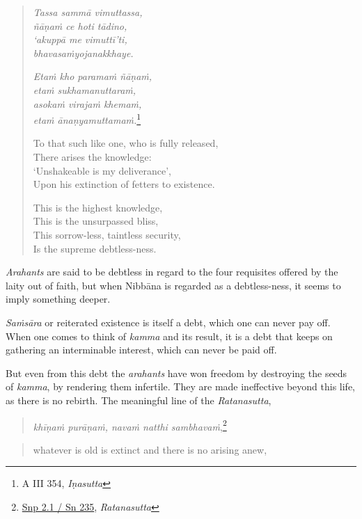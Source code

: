 \begin{quote}
\emph{Tassa sammā vimuttassa,}\\
\emph{ñāṇaṁ ce hoti tādino,}\\
\emph{`akuppā me vimuttī'ti,}\\
\emph{bhavasaṁyojanakkhaye.}

\emph{Etaṁ kho paramaṁ ñāṇaṁ,}\\
\emph{etaṁ sukhamanuttaraṁ,}\\
\emph{asokaṁ virajaṁ khemaṁ,}\\
\emph{etaṁ ānaṇyamuttamaṁ.}\footnote{A III 354, \emph{Iṇasutta}}

To that such like one, who is fully released,\\
There arises the knowledge:\\
`Unshakeable is my deliverance',\\
Upon his extinction of fetters to existence.

This is the highest knowledge,\\
This is the unsurpassed bliss,\\
This sorrow-less, taintless security,\\
Is the supreme debtless-ness.
\end{quote}

\emph{Arahants} are said to be debtless in regard to the four requisites offered by the laity out of faith, but when Nibbāna is regarded as a debtless-ness, it seems to imply something deeper.

\emph{Saṁsāra} or reiterated existence is itself a debt, which one can never pay off. When one comes to think of \emph{kamma} and its result, it is a debt that keeps on gathering an interminable interest, which can never be paid off.

But even from this debt the \emph{arahants} have won freedom by destroying the seeds of \emph{kamma}, by rendering them infertile. They are made ineffective beyond this life, as there is no rebirth. The meaningful line of the \emph{Ratanasutta},

\begin{quote}
\emph{khīṇaṁ purāṇaṁ, navaṁ natthi sambhavaṁ},\footnote{\href{https://suttacentral.net/snp2.1/pli/ms}{Snp 2.1 / Sn 235}, \emph{Ratanasutta}}
\end{quote}

\begin{quote}
whatever is old is extinct and there is no arising anew,
\end{quote}

